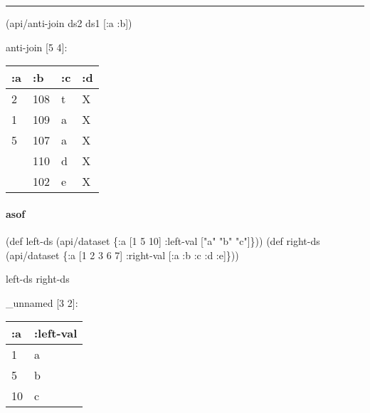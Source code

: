\documentclass[]{article}
\newenvironment{Shaded}{\begin{snugshade}}{\end{snugshade}}
\newcommand{\AttributeTok}[1]{\textcolor[rgb]{0.77,0.63,0.00}{#1}}
\newcommand{\BuiltInTok}[1]{#1}
\newcommand{\DecValTok}[1]{\textcolor[rgb]{0.00,0.00,0.81}{#1}}
\newcommand{\FunctionTok}[1]{\textcolor[rgb]{0.00,0.00,0.00}{#1}}
\newcommand{\NormalTok}[1]{#1}
\newcommand{\StringTok}[1]{\textcolor[rgb]{0.31,0.60,0.02}{#1}}
\let\oldparagraph\paragraph
\renewcommand{\paragraph}[1]{\oldparagraph{#1}\mbox{}}
\begin{document}
\begin{center}\rule{0.5\linewidth}{0.5pt}\end{center}

\begin{Shaded}
\begin{Highlighting}[]
\NormalTok{(api/anti-join ds2 ds1 [}\AttributeTok{:a} \AttributeTok{:b}\NormalTok{])}
\end{Highlighting}
\end{Shaded}

anti-join {[}5 4{]}:

\begin{longtable}[]{@{}llll@{}}
\toprule
:a & :b & :c & :d\tabularnewline
\midrule
\endhead
2 & 108 & t & X\tabularnewline
1 & 109 & a & X\tabularnewline
5 & 107 & a & X\tabularnewline
& 110 & d & X\tabularnewline
& 102 & e & X\tabularnewline
\bottomrule
\end{longtable}

\hypertarget{asof}{%
\paragraph{asof}\label{asof}}

\begin{Shaded}
\begin{Highlighting}[]
\NormalTok{(}\BuiltInTok{def}\FunctionTok{ left-ds }\NormalTok{(api/dataset \{}\AttributeTok{:a}\NormalTok{ [}\DecValTok{1} \DecValTok{5} \DecValTok{10}\NormalTok{]}
                           \AttributeTok{:left-val}\NormalTok{ [}\StringTok{"a"} \StringTok{"b"} \StringTok{"c"}\NormalTok{]\}))}
\NormalTok{(}\BuiltInTok{def}\FunctionTok{ right-ds }\NormalTok{(api/dataset \{}\AttributeTok{:a}\NormalTok{ [}\DecValTok{1} \DecValTok{2} \DecValTok{3} \DecValTok{6} \DecValTok{7}\NormalTok{]}
                            \AttributeTok{:right-val}\NormalTok{ [}\AttributeTok{:a} \AttributeTok{:b} \AttributeTok{:c} \AttributeTok{:d} \AttributeTok{:e}\NormalTok{]\}))}
\end{Highlighting}
\end{Shaded}

\begin{Shaded}
\begin{Highlighting}[]
\NormalTok{left-ds}
\NormalTok{right-ds}
\end{Highlighting}
\end{Shaded}

\_unnamed {[}3 2{]}:

\begin{longtable}[]{@{}ll@{}}
\toprule
:a & :left-val\tabularnewline
\midrule
\endhead
1 & a\tabularnewline
5 & b\tabularnewline
10 & c\tabularnewline
\bottomrule
\end{longtable}
\end{document}
